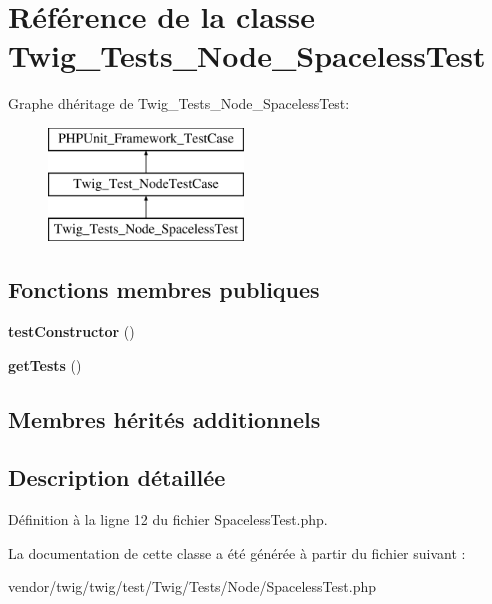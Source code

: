 \hypertarget{class_twig___tests___node___spaceless_test}{}\section{Référence de la classe Twig\+\_\+\+Tests\+\_\+\+Node\+\_\+\+Spaceless\+Test}
\label{class_twig___tests___node___spaceless_test}
Graphe d\textquotesingle{}héritage de Twig\+\_\+\+Tests\+\_\+\+Node\+\_\+\+Spaceless\+Test\+:\begin{figure}[H]
\begin{center}
\leavevmode
\includegraphics[height=3.000000cm]{class_twig___tests___node___spaceless_test}
\end{center}
\end{figure}
\subsection*{Fonctions membres publiques}
\begin{DoxyCompactItemize}
\item 
{\bfseries test\+Constructor} ()\hypertarget{class_twig___tests___node___spaceless_test_a47094dc941e72950570900d1418f89c6}{}\label{class_twig___tests___node___spaceless_test_a47094dc941e72950570900d1418f89c6}

\item 
{\bfseries get\+Tests} ()\hypertarget{class_twig___tests___node___spaceless_test_a7e247dd31cc8d37a6c97353a062a0080}{}\label{class_twig___tests___node___spaceless_test_a7e247dd31cc8d37a6c97353a062a0080}

\end{DoxyCompactItemize}
\subsection*{Membres hérités additionnels}


\subsection{Description détaillée}


Définition à la ligne 12 du fichier Spaceless\+Test.\+php.



La documentation de cette classe a été générée à partir du fichier suivant \+:\begin{DoxyCompactItemize}
\item 
vendor/twig/twig/test/\+Twig/\+Tests/\+Node/Spaceless\+Test.\+php\end{DoxyCompactItemize}
